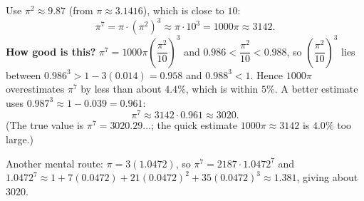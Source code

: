 Use $\pi^2\approx9.87$ (from $\pi\approx3.1416$), which is close to $10$:
\[
\pi^7=\pi\cdot\left(\pi^2\right)^3\approx\pi\cdot10^3=1000\pi\approx3142 .
\]
\textbf{How good is this?} $\pi^7=1000\pi\left(\dfrac{\pi^2}{10}\right)^3$ and $0.986<\dfrac{\pi^2}{10}<0.988$, so $\left(\dfrac{\pi^2}{10}\right)^3$ lies between $0.986^3>1-3(0.014)=0.958$ and $0.988^3<1$. Hence $1000\pi$ overestimates $\pi^7$ by less than about $4.4\%$, which is within $5\%$. A better estimate uses $0.987^3\approx1-0.039=0.961$:
\[
\pi^7\approx3142\cdot0.961\approx\boxed{3020}.
\]
(The true value is $\pi^7=3020.29\ldots$; the quick estimate $1000\pi\approx3142$ is $4.0\%$ too large.)

Another mental route: $\pi=3(1.0472)$, so $\pi^7=2187\cdot1.0472^7$ and $1.0472^7\approx1+7(0.0472)+21(0.0472)^2+35(0.0472)^3\approx1.381$, giving about $3020$.
